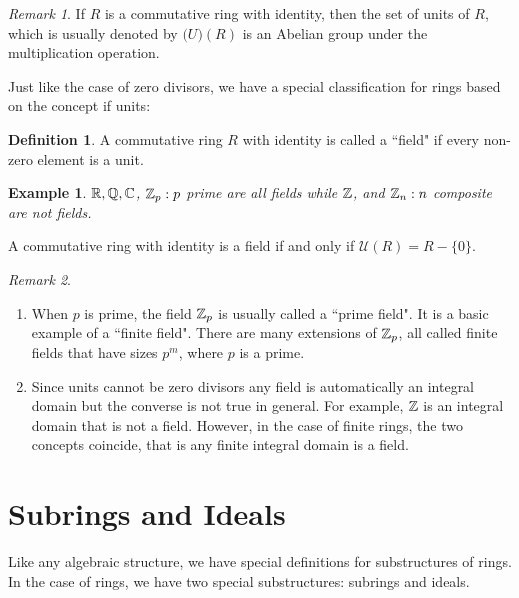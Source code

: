 \documentclass[12pt]{article}
\theoremstyle{plain}
\newtheorem{example}{Example}
\theoremstyle{definition}
\newtheorem{definition}{Definition}
\theoremstyle{remark}
\newtheorem{remark}{Remark}
\begin{document}
\begin{remark}
If $R$ is a commutative ring with identity, then the set of units of $R$, which is usually denoted by $\mathcal(U)(R)$ is an Abelian group under the multiplication operation.
\end{remark}

Just like the case of zero divisors, we have a special classification for rings based on the concept if units:
\begin{definition}
A commutative ring $R$ with identity is called a ``field" if every non-zero element is a unit.
\end{definition}
\begin{example}
$\mathbb{R}, \mathbb{Q}, \mathbb{C}$, $\mathbb{Z}_p:p$ prime are all fields while $\mathbb{Z}$, and $\mathbb{Z}_n:n$ composite are not fields.
\end{example}
A commutative ring with identity is a field if and only if $\mathcal{U}(R) = R -\{0\}$.
\begin{remark}
\begin{enumerate}
\item When $p$ is prime, the field $\mathbb{Z}_p$ is usually called a ``prime field". It is a basic example of a ``finite field". There are many extensions of $\mathbb{Z}_p$, all called finite fields that have sizes $p^m$, where $p$ is a prime.

\item Since units cannot be zero divisors any field is automatically an integral domain but the converse is not true in general. For example, $\mathbb{Z}$ is an integral domain that is not a field. However, in the case of finite rings, the two concepts coincide, that is any finite integral domain is a field.
\end{enumerate}
\end{remark}

\section{Subrings and Ideals}
Like any algebraic structure, we have special definitions for substructures of rings. In the case of rings, we have two special substructures: subrings and ideals.
\end{document}
